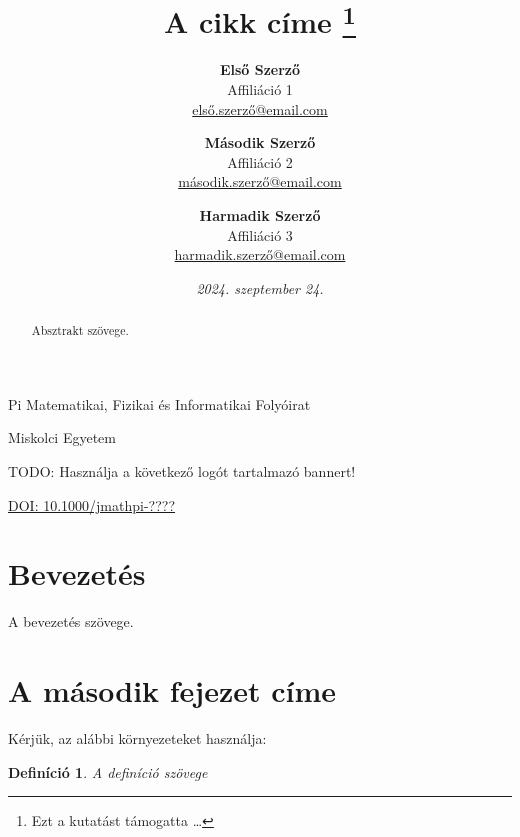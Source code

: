 \documentclass[a4paper,12pt]{article}
\newtheorem{definition}[theorem]{Definíció}
\begin{document}
\pagestyle{fancy}

\title{\sc A cikk címe \thanks{Ezt a kutatást támogatta \dots}}

\author{
	\textbf{Első Szerző} \\
	Affiliáció 1 \\
	\href{mailto:első.szerző@email.com}{első.szerző@email.com}
\and
	\textbf{Második Szerző} \\
	Affiliáció 2 \\
	\href{mailto:második.szerző@email.com}{második.szerző@email.com}
\and
	\textbf{Harmadik Szerző} \\
	Affiliáció 3 \\
	\href{mailto:harmadik.szerző@email.com}{harmadik.szerző@email.com}
}

\date{\textit{2024. szeptember 24.}}

Pi Matematikai, Fizikai és Informatikai Folyóirat

Miskolci Egyetem 

TODO: Használja a következő logót tartalmazó bannert!

\href{https://doi.org/10.1000/jmathpi-1}{DOI: 10.1000/jmathpi-????}

{\let\newpage\relax\maketitle}

\begin{abstract}
Absztrakt szövege.
\end{abstract}

{\def\thefootnote{}}

\section{Bevezetés}

A bevezetés szövege. 

\section{A második fejezet címe}

Kérjük, az alábbi környezeteket használja:

\begin{definition}
A definíció szövege
\end{definition}
\end{document}
